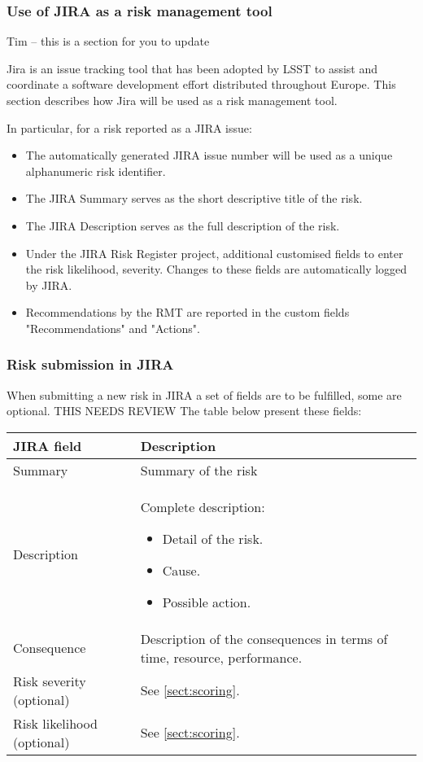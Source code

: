 \subsubsection{Use of JIRA as a risk management tool}

{\color{red} Tim -- this is a section for you to update}


Jira is an issue tracking tool that has been adopted by LSST to assist and coordinate a software development effort distributed throughout Europe. This section describes how Jira will be used as a risk management tool.

In particular, for a risk reported as a JIRA issue:
\begin{itemize}
\item The automatically generated JIRA issue number will be used as a unique alphanumeric risk identifier.
\item The JIRA Summary serves as the short descriptive title of the risk.
\item The JIRA Description serves as the full description of the risk.
\item Under the JIRA Risk Register project, additional customised fields to enter the risk likelihood, severity. Changes to these fields are automatically logged by JIRA.
\item Recommendations by the RMT are reported in the custom fields "Recommendations" and "Actions".
\end{itemize}


\subsubsection{Risk submission in JIRA}

 When submitting a new risk in JIRA a set of fields are to be fulfilled, some are optional.
{\color{red} THIS NEEDS REVIEW}
 The table below present these fields:
\begin{longtable}{|l|p{}|}\hline
\textbf{JIRA field} & \textbf{Description} \\ \hline
Summary    & Summary of the risk  \\ \hline
Description    & Complete description:
\begin{itemize}
  \item Detail of the risk.
  \item Cause.
  \item Possible action.
\end{itemize}
\\
\hline
Consequence  & Description of the consequences in terms of time, resource, performance.\\
\hline
Risk severity (optional)   & See \ref{sect:scoring}. \\
\hline
Risk likelihood (optional)   & See \ref{sect:scoring}. \\
\hline
\end{longtable}

